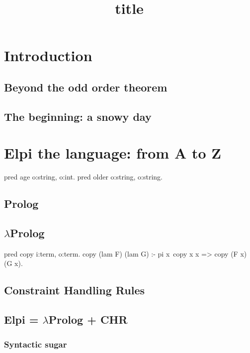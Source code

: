 \documentclass[a4paper, 11pt]{book}
\title{title}
\begin{document}
\setcounter{tocdepth}{4}
\tableofcontents

\chapter{Introduction}

\section{Beyond the odd order theorem}
\section{The beginning: a snowy day}

\chapter{Elpi the language: from A to Z}

\begin{elpicode}
pred age o:string, o:int.
pred older o:string, o:string.

\end{elpicode}
    

\section{Prolog}

\section{$\lambda$Prolog}

\begin{elpicode}
pred copy i:term, o:term.
copy (lam F) (lam G) :- pi x\ copy x x => copy (F x) (G x).
\end{elpicode}

\section{Constraint Handling Rules}


\section{Elpi = $\lambda$Prolog + CHR}

\subsection{Syntactic sugar}
\end{document}
